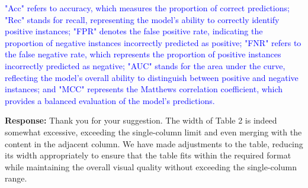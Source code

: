 \documentclass[a4paper,twoside,11pt,dvipsnames]{reviewresponse}
\begin{document}
\textcolor{blue}{
"Acc" refers to accuracy, which measures the proportion of correct predictions; "Rec" stands for recall, representing the model's ability to correctly identify positive instances; "FPR" denotes the false positive rate, indicating the proportion of negative instances incorrectly predicted as positive; "FNR" refers to the false negative rate, which represents the proportion of positive instances incorrectly predicted as negative; "AUC" stands for the area under the curve, reflecting the model's overall ability to distinguish between positive and negative instances; and "MCC" represents the Matthews correlation coefficient, which provides a balanced evaluation of the model's predictions.
}


\textbf{Response:} 
Thank you for your suggestion. The width of Table 2 is indeed somewhat excessive, exceeding the single-column limit and even merging with the content in the adjacent column. We have made adjustments to the table, reducing its width appropriately to ensure that the table fits within the required format while maintaining the overall visual quality without exceeding the single-column range.
\end{document}
